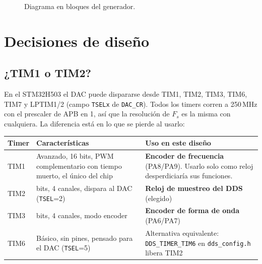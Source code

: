 \documentclass[11pt,a4paper]{article}
\begin{document}
\begin{figure}[h]
\caption{Diagrama en bloques del generador.}
\end{figure}

\section{Decisiones de diseño}

\subsection{¿TIM1 o TIM2?}

En el STM32H503 el DAC puede dispararse desde TIM1, TIM2, TIM3, TIM6, TIM7 y
LPTIM1/2 (campo \texttt{TSELx} de \texttt{DAC\_CR}). Todos los timers corren a
250\,MHz con el prescaler de APB en 1, así que la resolución de $F_s$ es la
misma con cualquiera. La diferencia está en lo que se pierde al usarlo:

\begin{center}
\begin{tabularx}{\linewidth}{@{}l>{\raggedright\arraybackslash}X>{\raggedright\arraybackslash}X@{}}
\toprule
\textbf{Timer} & \textbf{Características} & \textbf{Uso en este diseño} \\
\midrule
TIM1 & Avanzado, 16 bits, PWM complementario con tiempo muerto, el único del chip &
       \textbf{Encoder de frecuencia} (PA8/PA9). Usarlo solo como reloj desperdiciaría sus funciones. \\
TIM2 & 32 bits, 4 canales, dispara al DAC (\texttt{TSEL}=2) &
       \textbf{Reloj de muestreo del DDS} (elegido) \\
TIM3 & 16 bits, 4 canales, modo encoder & \textbf{Encoder de forma de onda} (PA6/PA7) \\
TIM6 & Básico, sin pines, pensado para el DAC (\texttt{TSEL}=5) &
       Alternativa equivalente: \texttt{DDS\_TIMER\_TIM6} en \texttt{dds\_config.h} libera TIM2 \\
\bottomrule
\end{tabularx}
\end{center}
\end{document}
